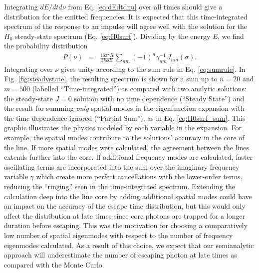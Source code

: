 \documentclass{aastex63}
\newcommand{\be}{\begin{eqnarray}}
\newcommand{\ee}{\end{eqnarray}}
\begin{document}
Integrating $dE/dt d\nu$ from Eq. \ref{eq:dEdtdnu} over all times should give a distribution for the emitted frequencies. It is expected that this time-integrated spectrum of the response to an impulse will agree well with the solution for the $H_0$ steady-state spectrum (Eq. \ref{eq:H0surf}). Dividing by the energy $E$, we find the probability distribution
\be \label{eq:spectrum}
P(\nu) & = &  \frac{16\pi^2 R}{3k\phi E}  \sum_{nm} (-1)^n \gamma_{nm}^{-1} J_{nm}(\sigma).
\ee
Integrating over $\nu$ gives unity according to the sum rule in Eq. \ref{eq:sumrule}. In Fig. \ref{fig:steadystate}, the resulting spectrum is shown for a sum up to $n=20$ and $m=500$ (labelled ``Time-integrated'') as compared with two analytic solutions: the steady-state $J=0$ solution with no time dependence (``Steady State'') and the result for summing \textit{only} spatial modes in the eigenfunction expansion with the time dependence ignored (``Partial Sum''), as in Eq. \ref{eq:H0surf_sum}. This graphic illustrates the physics modeled by each variable in the expansion. For example, the spatial modes contribute to the solutions' accuracy in the core of the line. If more spatial modes were calculated, the agreement between the lines extends further into the core. If additional frequency modes are calculated, faster-oscillating terms are incorporated into the sum over the imaginary frequency variable $\gamma$ which create more perfect cancellations with the lower-order terms, reducing the ``ringing'' seen in the time-integrated spectrum. Extending the calculation deep into the line core by adding additional spatial modes could have an impact on the accuracy of the escape time distribution, but this would only affect the distribution at late times since core photons are trapped for a longer duration before escaping. This was the motivation for choosing a comparatively low number of spatial eigenmodes with respect to the number of frequency eigenmodes calculated. As a result of this choice, we expect that our semianalytic approach will underestimate the number of escaping photon at late times as compared with the Monte Carlo.
\end{document}
